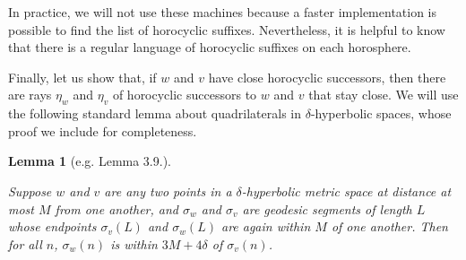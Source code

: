 \documentclass[10pt,a4paper]{amsart}
\newtheorem{lemma}[theorem]{Lemma}
\theoremstyle{definition}
\theoremstyle{remark}
\begin{document}
	In practice, we will not use these machines because a faster implementation is possible to find the list of horocyclic suffixes. Nevertheless, it is helpful to know that there is a regular language of horocyclic suffixes on each horosphere.
	
	Finally, let us show that, if $w$ and $v$ have close horocyclic successors, then there are rays $\eta_w$ and $\eta_v$ of horocyclic successors to $w$ and $v$ that stay close. We will use the following standard lemma about quadrilaterals in $\delta$-hyperbolic spaces, whose proof we include for completeness.
	
	\begin{lemma}[e.g. \cite{CGSR} Lemma 3.9.] \label{ThinAlmostBigons}
		
		Suppose $w$ and $v$ are any two points in a $\delta$-hyperbolic metric space at distance at most $M$ from one another, and $\sigma_w$ and $\sigma_v$ are geodesic segments of length $L$ whose endpoints $\sigma_v(L)$ and $\sigma_w(L)$ are again within $M$ of one another. Then for all $n$, $\sigma_w(n)$ is within $3M+4\delta$ of $\sigma_v(n)$. 
		
	\end{lemma}
	
\end{document}
